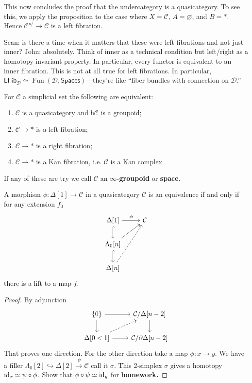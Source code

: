 \documentclass{amsart}
\DeclareMathOperator{\Fun}{Fun}
\begin{document}
This now concludes the proof that the undercategory is a quasicategory. To see this,
we apply the proposition to the case where $X=\mathcal{C}$, $A=\varnothing$, and $B=*$.
Hence $\mathcal{C}^{p/}\to \mathcal{C}$ is a left fibration.

Sean: is there a time when it matters that these were left fibrations and not just inner?
John: absolutely. Think of inner as a technical condition but left/right as a homotopy
invariant property. In particular, every functor is equivalent to an inner fibration.
This is not at all true for left fibrations. In particular,
$\mathsf{LFib}_\mathcal{D}\simeq \Fun(\mathcal{D},\mathsf{Spaces})$---they're
like ``fiber bundles with connection on $\mathcal{D}$.''

\begin{proposition}[HTT 1.2.5.1]
    For $\mathcal{C}$ a simplicial set the following are equivalent:
    \begin{enumerate}
        \item $\mathcal{C}$ is a quasicategory and $\mathsf{h}\mathcal{C}$ is a groupoid;
        \item $\mathcal{C}\to *$ is a left fibration;
        \item $\mathcal{C}\to *$ is a right fibration;
        \item $\mathcal{C}\to *$ is a Kan fibration, i.e. $\mathcal{C}$ is a Kan complex.
    \end{enumerate}
    If any of these are try we call $\mathcal{C}$ an \textbf{$\infty$-groupoid} or \textbf{space}.
\end{proposition}

\begin{proposition}[HTT 1.2.4.3]
    A morphism $\phi:\Delta[1]\to\mathcal{C}$ in a quasicategory $\mathcal{C}$ is
    an equivalence if and only if for any extension $f_0$
    \begin{equation*}
        \begin{tikzcd}
            \Delta[1] \dar[hook] \rar{\phi} & \mathcal{C}\\
            \Lambda_0[n]\dar[hook] \ar[ur]{f_0} & \\
            \Delta[n]\ar[uur,dashed]{f} &
        \end{tikzcd}
    \end{equation*}
    there is a lift to a map $f$.
\end{proposition}
\begin{proof}
    By adjunction
    \begin{equation*}
        \begin{tikzcd}
            \{0\} \rar\dar & \mathcal{C}/\Delta[n-2]\dar \\
            \Delta[0<1] \rar\ar[ur,dashed] & \mathcal{C}/\partial\Delta[n-2]
        \end{tikzcd}
    \end{equation*}
    That proves one direction. For the other direction take a map $\phi:x\to y$.
    We have a filler $\Lambda_0[2]\hookrightarrow\Delta[2]\xrightarrow{\psi} \mathcal{C}$ call it $\sigma$.
    This 2-simplex $\sigma$ gives a homotopy $\operatorname{id}_x\simeq \psi\circ\phi$. Show that
    $\phi\circ\psi\simeq \operatorname{id}_y$ for \textbf{homework.}
\end{proof}
\end{document}
